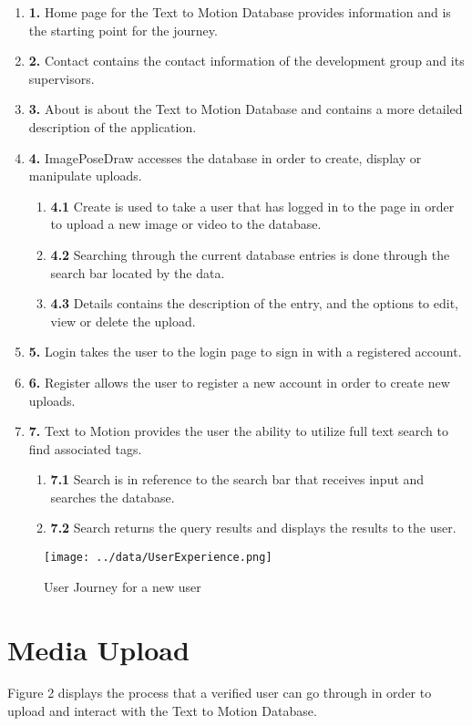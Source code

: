 \documentclass{scrreprt}
\begin{document}
\begin{enumerate}
  \item \textbf {1.} Home page for the Text to Motion Database provides information and is the starting point for the journey.
  \item \textbf {2.} Contact contains the contact information of the development group and its supervisors.
  \item \textbf {3.} About is about the Text to Motion Database and contains a more detailed description of the application.
  \item \textbf {4.} ImagePoseDraw accesses the database in order to create, display or manipulate uploads.
  \begin{enumerate}
    \item \textbf {4.1} Create is used to take a user that has logged in to the page in order to upload a new image or video to the database.
    \item \textbf {4.2} Searching through the current database entries is done through the search bar located by the data.
    \item \textbf {4.3} Details contains the description of the entry, and the options to edit, view or delete the upload.
  \end{enumerate}
  \item \textbf {5.} Login takes the user to the login page to sign in with a registered account.
  \item \textbf {6.} Register allows the user to register a new account in order to create new uploads.
  \item \textbf {7.} Text to Motion provides the user the ability to utilize full text search to find associated tags.
  \begin{enumerate}
    \item \textbf {7.1} Search is in reference to the search bar that receives input and searches the database.
    \item \textbf {7.2} Search returns the query results and displays the results to the user.
  \end{enumerate}
\end{enumerate}

\begin{figure}[!ht]
        \caption{User Journey for a new user}
        \label{erDiagram}
        \centering
        \texttt{[image: ../data/UserExperience.png]}
\end{figure}

\section{Media Upload}
Figure 2 displays the process that a verified user can go through in order to upload and interact with the Text to Motion Database.
\end{document}

